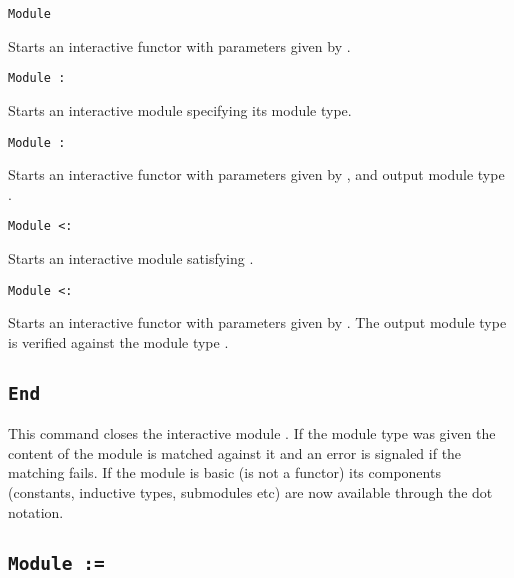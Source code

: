 \begin{Variants}

\item{\tt Module {\ident} {\modbindings}}

  Starts an interactive functor with parameters given by {\modbindings}.

\item{\tt Module {\ident} \verb.:. {\modtype}}

  Starts an interactive module specifying its module type. 

\item{\tt Module {\ident} {\modbindings} \verb.:. {\modtype}}

  Starts an interactive functor with parameters given by
  {\modbindings}, and output module type {\modtype}.

\item{\tt Module {\ident} \verb.<:. {\modtype}}

  Starts an interactive module satisfying {\modtype}. 

\item{\tt Module {\ident} {\modbindings} \verb.<:. {\modtype}}

  Starts an interactive functor with parameters given by
  {\modbindings}. The output module type is verified against the
  module type {\modtype}.

\end{Variants}

\subsection{\tt End {\ident}
}

This command closes the interactive module {\ident}. If the module type
was given the content of the module is matched against it and an error
is signaled if the matching fails. If the module is basic (is not a
functor) its components (constants, inductive types, submodules etc) are
now available through the dot notation.

\begin{ErrMsgs}
\item {}
\item {}
\item {}
\end{ErrMsgs}


\subsection{\tt Module {\ident} := {\modexpr}
}

